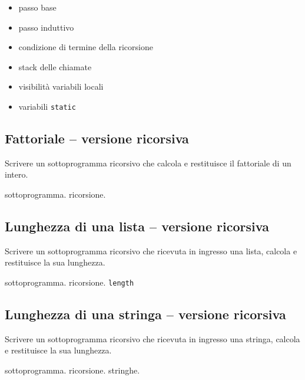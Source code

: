 \begin{itemize}
\item passo base
\item passo induttivo
\item condizione di termine della ricorsione
\item stack delle chiamate
\item visibilit\`a variabili locali
\item variabili \texttt{static}
\end{itemize}

\mysep{}

\subsection{Fattoriale -- versione ricorsiva}
Scrivere un sottoprogramma ricorsivo che calcola e restituisce il fattoriale di un intero.

\begin{tags}
sottoprogramma. ricorsione. 
\end{tags}


\subsection{Lunghezza di una lista -- versione ricorsiva}
Scrivere un sottoprogramma ricorsivo che ricevuta in ingresso una lista, calcola e restituisce la sua lunghezza.

\begin{tags}
sottoprogramma. ricorsione. 
\texttt{length}
\end{tags}


\subsection{Lunghezza di una stringa -- versione ricorsiva}
Scrivere un sottoprogramma ricorsivo che ricevuta in ingresso una stringa, calcola e restituisce la sua lunghezza.

\begin{tags}
sottoprogramma. ricorsione. stringhe.
\end{tags}


